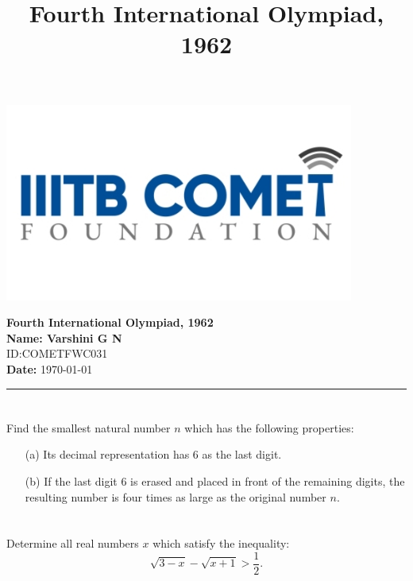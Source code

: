 \documentclass[12pt,a4paper]{article}
\begin{document}
\begin{center}
\begin{minipage}{0.2\textwidth}
    \includegraphics[width=\linewidth]{iiit_logo.png} 
\end{minipage}
\hfill
\begin{minipage}{0.75\textwidth}
    \centering
    {\Large \textbf{Fourth International Olympiad, 1962}}\\[1ex]
    \textbf{Name: Varshini G N} \\[0.5ex]
    ID:COMETFWC031\\
    \textbf{Date:} \today
\end{minipage}
\end{center}

\vspace{1em}
\title{Fourth International Olympiad, 1962}
\hrule
\vspace{1em}

\section{}
Find the smallest natural number $n$ which has the following properties:
\begin{itemize}
    \item[(a)] Its decimal representation has 6 as the last digit.
    \item[(b)] If the last digit 6 is erased and placed in front of the remaining digits, the resulting number is four times as large as the original number $n$.
\end{itemize}

\section{}
Determine all real numbers $x$ which satisfy the inequality:
\[
\sqrt{3 - x} - \sqrt{x + 1} > \frac{1}{2}.
\]
\end{document}
